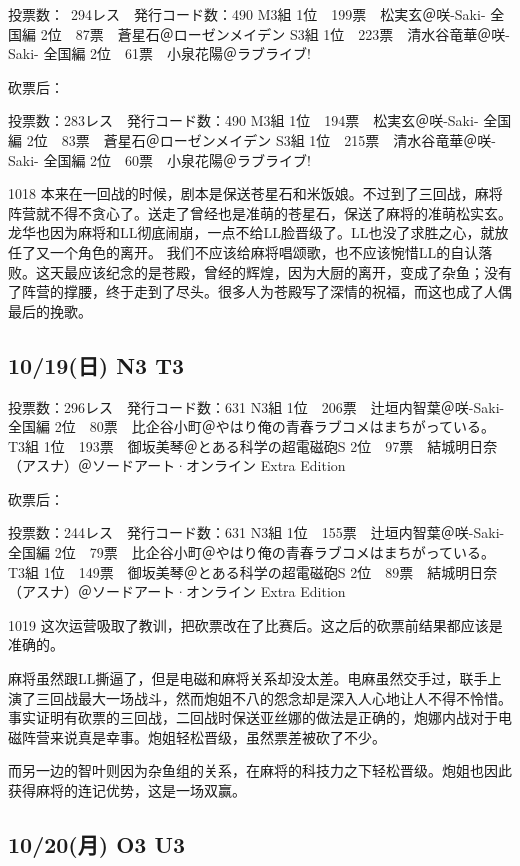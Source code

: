     投票数：~294レス　発行コード数：490
    M3組
    1位　199票　松実玄＠咲-Saki- 全国編
    2位　87票　蒼星石＠ローゼンメイデン
    S3組
    1位　223票　清水谷竜華＠咲-Saki- 全国編
    2位　61票　小泉花陽＠ラブライブ!

砍票后：

    投票数：283レス　発行コード数：490
    M3組
    1位　194票　松実玄＠咲-Saki- 全国編
    2位　83票　蒼星石＠ローゼンメイデン
    S3組
    1位　215票　清水谷竜華＠咲-Saki- 全国編
    2位　60票　小泉花陽＠ラブライブ!

1018 本来在一回战的时候，剧本是保送苍星石和米饭娘。不过到了三回战，麻将阵营就不得不贪心了。送走了曾经也是准萌的苍星石，保送了麻将的准萌松实玄。龙华也因为麻将和LL彻底闹崩，一点不给LL脸晋级了。LL也没了求胜之心，就放任了又一个角色的离开。
我们不应该给麻将唱颂歌，也不应该惋惜LL的自认落败。这天最应该纪念的是苍殿，曾经的辉煌，因为大厨的离开，变成了杂鱼；没有了阵营的撑腰，终于走到了尽头。很多人为苍殿写了深情的祝福，而这也成了人偶最后的挽歌。

\subsection{10/19(日) N3 T3}

    投票数：296レス　発行コード数：631
    N3組
    1位　206票　辻垣内智葉＠咲-Saki- 全国編
    2位　80票　比企谷小町＠やはり俺の青春ラブコメはまちがっている。
    T3組
    1位　193票　御坂美琴＠とある科学の超電磁砲S
    2位　97票　結城明日奈（アスナ）＠ソードアート·オンライン Extra Edition

砍票后：

    投票数：244レス　発行コード数：631
    N3組
    1位　155票　辻垣内智葉＠咲-Saki- 全国編
    2位　79票　比企谷小町＠やはり俺の青春ラブコメはまちがっている。
    T3組
    1位　149票　御坂美琴＠とある科学の超電磁砲S
    2位　89票　結城明日奈（アスナ）＠ソードアート·オンライン Extra Edition

1019 这次运营吸取了教训，把砍票改在了比赛后。这之后的砍票前结果都应该是准确的。

麻将虽然跟LL撕逼了，但是电磁和麻将关系却没太差。电麻虽然交手过，联手上演了三回战最大一场战斗，然而炮姐不八的怨念却是深入人心地让人不得不怜惜。事实证明有砍票的三回战，二回战时保送亚丝娜的做法是正确的，炮娜内战对于电磁阵营来说真是幸事。炮姐轻松晋级，虽然票差被砍了不少。

而另一边的智叶则因为杂鱼组的关系，在麻将的科技力之下轻松晋级。炮姐也因此获得麻将的连记优势，这是一场双赢。

\subsection{10/20(月) O3 U3}

